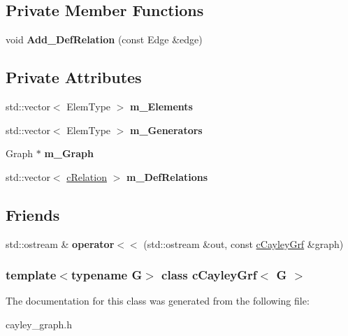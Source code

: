 \subsection*{\-Private \-Member \-Functions}
\begin{DoxyCompactItemize}
\item 
\hypertarget{classcCayleyGrf_a5aef2537b624f06052dc852890b37048}{
void {\bfseries \-Add\-\_\-\-Def\-Relation} (const \-Edge \&edge)}
\label{classcCayleyGrf_a5aef2537b624f06052dc852890b37048}

\end{DoxyCompactItemize}
\subsection*{\-Private \-Attributes}
\begin{DoxyCompactItemize}
\item 
\hypertarget{classcCayleyGrf_af4c3fa359332e9097ad511da6df21e01}{
std\-::vector$<$ \-Elem\-Type $>$ {\bfseries m\-\_\-\-Elements}}
\label{classcCayleyGrf_af4c3fa359332e9097ad511da6df21e01}

\item 
\hypertarget{classcCayleyGrf_aa0263f38d2605e8b1c43830af0dd7d9b}{
std\-::vector$<$ \-Elem\-Type $>$ {\bfseries m\-\_\-\-Generators}}
\label{classcCayleyGrf_aa0263f38d2605e8b1c43830af0dd7d9b}

\item 
\hypertarget{classcCayleyGrf_a8ac7f5226ca5868bfb9bbfbd10021981}{
\-Graph $\ast$ {\bfseries m\-\_\-\-Graph}}
\label{classcCayleyGrf_a8ac7f5226ca5868bfb9bbfbd10021981}

\item 
\hypertarget{classcCayleyGrf_a89075c8eb6020ede50c560e0c661f149}{
std\-::vector$<$ \hyperlink{classcRelation}{c\-Relation} $>$ {\bfseries m\-\_\-\-Def\-Relations}}
\label{classcCayleyGrf_a89075c8eb6020ede50c560e0c661f149}

\end{DoxyCompactItemize}
\subsection*{\-Friends}
\begin{DoxyCompactItemize}
\item 
\hypertarget{classcCayleyGrf_a335728ff704ed565af614d4eadbc4609}{
std\-::ostream \& {\bfseries operator$<$$<$} (std\-::ostream \&out, const \hyperlink{classcCayleyGrf}{c\-Cayley\-Grf} \&graph)}
\label{classcCayleyGrf_a335728ff704ed565af614d4eadbc4609}

\end{DoxyCompactItemize}
\subsubsection*{template$<$typename G$>$ class c\-Cayley\-Grf$<$ G $>$}



\-The documentation for this class was generated from the following file\-:\begin{DoxyCompactItemize}
\item 
cayley\-\_\-graph.\-h\end{DoxyCompactItemize}
